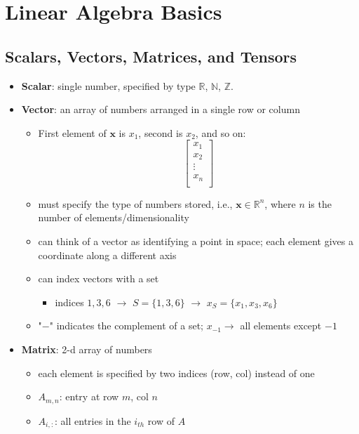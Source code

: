 \section{Linear Algebra Basics}
\subsection{Scalars, Vectors, Matrices, and Tensors}
\begin{itemize}
    \item \textbf{Scalar}: single number, specified by type $\mathbb{R}$, $\mathbb{N}$, $\mathbb{Z}$.
    \item \textbf{Vector}: an array of numbers arranged in a single row or column 
    \begin{itemize}
        \item First element of $\mathbf{x}$ is $x_1$, second is $x_2$, and so on:
        $$\begin{bmatrix}
            x_1 \\
            x_2 \\
            \vdots \\
            x_n \\
        \end{bmatrix}$$
        \item must specify the type of numbers stored, i.e., $\mathbf{x} \in \mathbb{R}^n$, where $n$ is the number of elements/dimensionality
        \item can think of a vector as identifying a point in space; each element gives a coordinate along a different axis
        \item can index vectors with a set
        \begin{itemize}
            \item indices $1, 3, 6$ $\rightarrow$ $S = \{1, 3, 6\}$ $\rightarrow$ $x_S = \{x_1, x_3, x_6\}$
        \end{itemize}
        \item "$-$" indicates the complement of a set; $x_{-1} \rightarrow$ all elements except $-1$
    \end{itemize}
    \item \textbf{Matrix}: 2-d array of numbers
    \begin{itemize}
        \item each element is specified by two indices (row, col) instead of one
        \item $A_{m,n}$: entry at row $m$, col $n$
        \item $A_{i, :}$: all entries in the $i_{th}$ row of $A$

\end{itemize}
\end{itemize}
